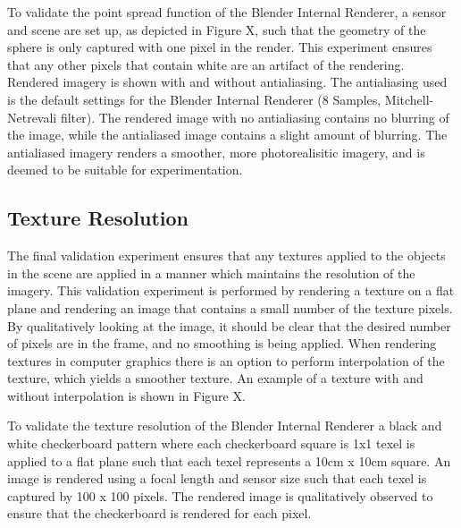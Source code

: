 To validate the point spread function of the Blender Internal Renderer, a sensor and scene are set up, as depicted in Figure X, such that the geometry of the sphere is only captured with one pixel in the render.  This experiment ensures that any other pixels that contain white are an artifact of the rendering.  Rendered imagery is shown with and without antialiasing.  The antialiasing used is the default settings for the Blender Internal Renderer (8 Samples, Mitchell-Netrevali filter).  The rendered image with no antialiasing contains no blurring of the image, while the antialiased image contains a slight amount of blurring.  The antialiased imagery renders a smoother, more photorealisitic imagery, and is deemed to be suitable for experimentation. 

\subsection{Texture Resolution}
The final validation experiment ensures that any textures applied to the objects in the scene are applied in a manner which maintains the resolution of the imagery.  This validation experiment is performed by rendering a texture on a flat plane and rendering an image that contains a small number of the texture pixels.  By qualitatively looking at the image, it should be clear that the desired number of pixels are in the frame, and no smoothing is being applied.  When rendering textures in computer graphics there is an option to perform interpolation of the texture, which yields a smoother texture.  An example of a texture with and without interpolation is shown in Figure X. 

To validate the texture resolution of the Blender Internal Renderer a black and white checkerboard pattern where each checkerboard square is 1x1 texel is applied to a flat plane such that each texel represents a 10cm x 10cm square.  An image is rendered using a focal length and sensor size such that each texel is captured by 100 x 100 pixels.  The rendered image is qualitatively observed to ensure that the checkerboard is rendered for each pixel.   

